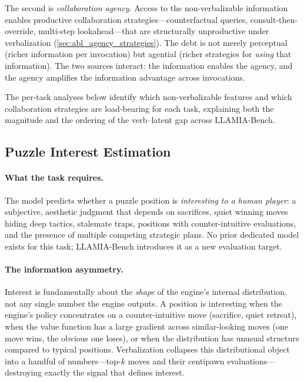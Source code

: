 The second is \emph{collaboration agency}.
Access to the non-verbalizable information enables productive collaboration
strategies---counterfactual queries, consult-then-override, multi-step
lookahead---that are structurally unproductive under verbalization
(\cref{sec:abl_agency_strategies}).
The debt is not merely perceptual (richer information per invocation) but
agential (richer strategies for \emph{using} that information).
The two sources interact: the information enables the agency, and the agency
amplifies the information advantage across invocations.

The per-task analyses below identify which non-verbalizable features and
which collaboration strategies are load-bearing for each task, explaining
both the magnitude and the ordering of the verb--latent gap across
LLAMIA-Bench.

\subsection{Puzzle Interest Estimation}
\label{sec:app_landscape_interest}

\paragraph{What the task requires.}
The model predicts whether a puzzle position is \emph{interesting to a human
player}: a subjective, aesthetic judgment that depends on sacrifices, quiet
winning moves hiding deep tactics, stalemate traps, positions with
counter-intuitive evaluations, and the presence of multiple competing
strategic plans.
No prior dedicated model exists for this task; LLAMIA-Bench introduces it as
a new evaluation target.

\paragraph{The information asymmetry.}
Interest is fundamentally about the \emph{shape} of the engine's internal
distribution, not any single number the engine outputs.
A position is interesting when the engine's policy concentrates on a
counter-intuitive move (sacrifice, quiet retreat), when the value function
has a large gradient across similar-looking moves (one move wins, the obvious
one loses), or when the distribution has unusual structure compared to
typical positions.
Verbalization collapses this distributional object into a handful of
numbers---top-$k$ moves and their centipawn evaluations---destroying exactly
the signal that defines interest.


